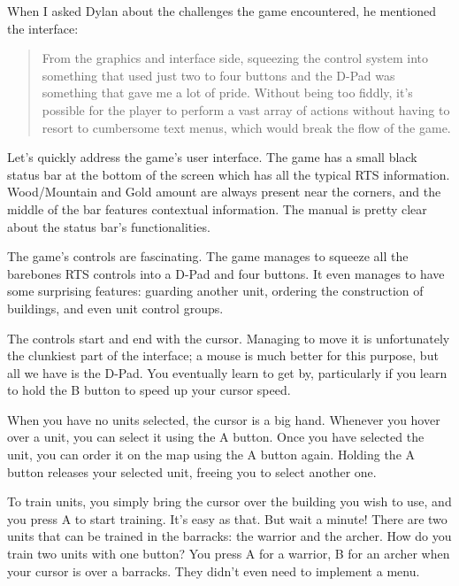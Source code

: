 \documentclass{book}
\begin{document}
When I asked Dylan about the challenges the game encountered, he mentioned the interface:\par
\begin{quote}
From the graphics and interface side, squeezing the control system into something that used just two to four buttons and the D-Pad was something that gave me a lot of pride. Without being too fiddly, it’s possible for the player to perform a vast array of actions without having to resort to cumbersome text menus, which would break the flow of the game.\par
\end{quote} \par
Let’s quickly address the game’s user interface. The game has a small black status bar at the bottom of the screen which has all the typical RTS information. Wood/Mountain and Gold amount are always present near the corners, and the middle of the bar features contextual information. The manual is pretty clear about the status bar’s functionalities.\par
\FloatBarrier\vspace{\baselineskip}\begin{figure}[H]\end{figure}
The game’s controls are fascinating. The game manages to squeeze all the barebones RTS controls into a D-Pad and four buttons. It even manages to have some surprising features: guarding another unit, ordering the construction of buildings, and even unit control groups.\par
The controls start and end with the cursor. Managing to move it is unfortunately the clunkiest part of the interface; a mouse is much better for this purpose, but all we have is the D-Pad. You eventually learn to get by, particularly if you learn to hold the B button to speed up your cursor speed.\par
When you have no units selected, the cursor is a big hand. Whenever you hover over a unit, you can select it using the A button. Once you have selected the unit, you can order it on the map using the A button again. Holding the A button releases your selected unit, freeing you to select another one.\par
To train units, you simply bring the cursor over the building you wish to use, and you press A to start training. It’s easy as that. But wait a minute! There are two units that can be trained in the barracks: the warrior and the archer. How do you train two units with one button? You press A for a warrior, B for an archer when your cursor is over a barracks. They didn’t even need to implement a menu.\par
\end{document}
